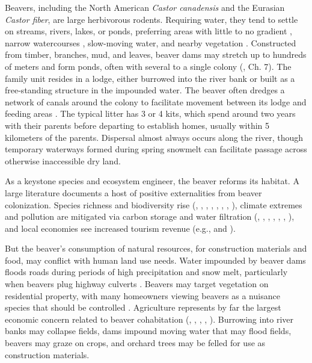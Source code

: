 Beavers, including the North American \textit{Castor canadensis} and the Eurasian \textit{Castor fiber}, are large herbivorous rodents. Requiring water, they tend to settle on streams, rivers, lakes, or ponds, preferring areas with little to no gradient \citep{muller-schwarze_beaver_2011}, narrow watercourses \citep{dittbrenner_modeling_2018}, slow-moving water, and nearby vegetation \citep{swinnen_environmental_2019}. Constructed from timber, branches, mud, and leaves, beaver dams may stretch up to hundreds of meters and form ponds, often with several to a single colony (\cite{muller-schwarze_beaver_2011}, Ch. 7). The family unit resides in a lodge, either burrowed into the river bank or built as a free-standing structure in the impounded water. The beaver often dredges a network of canals around the colony to facilitate movement between its lodge and feeding areas \citep{muller-schwarze_beaver_2011}. The typical litter has 3 or 4 kits, which spend around two years with their parents before departing to establish homes, usually within 5 kilometers of the parents. Dispersal almost always occurs along the river, though temporary waterways formed during spring snowmelt can facilitate passage across otherwise inaccessible dry land. 

As a keystone species and ecosystem engineer, the beaver reforms its habitat. A large literature documents a host of positive externalities from beaver colonization. Species richness and biodiversity rise (\cite{hossack_trends_2015}, \cite{wright_ecosystem_2002}, \cite{leidholt-bruner_beaver_1992}, \cite{bouwes_ecosystem_2016}, \cite{fedyn_beyond_2023}, \cite{kemp_qualitative_2012}, \cite{stringer_impacts_2016}, \cite{law_habitat_2016}), climate extremes and pollution are mitigated via carbon storage and water filtration (\cite{hood_beaver_2008}, \cite{dewey_beaver_2022}, \cite{johnston_beaver_2014}, \cite{fairfax_using_2018}, \cite{fairfax_smokey_2020}, \cite{lazar_beaver_2015}, \cite{wohl_landscape-scale_2013}), and local economies see increased tourism revenue (e.g., \cite{campbell_economic_2007} and \cite{auster_wildlife_2020}).

But the beaver's consumption of natural resources, for construction materials and food, may conflict with human land use needs. Water impounded by beaver dams floods roads during periods of high precipitation and snow melt, particularly when beavers plug highway culverts \citep{jensen_habitat_2001}. Beavers may target vegetation on residential property, with many homeowners viewing beavers as a nuisance species that should be controlled \citep{jonker_experiences_2006}. Agriculture represents by far the largest economic concern related to beaver cohabitation (\cite{hamilton_tayside_2015}, \cite{noauthor_beavers_2017}, \cite{mikulka_european_2020}, \cite{janiszewski_damage_2019}, \cite{campbell-palmer_managing_2015}). Burrowing into river banks may collapse fields, dams impound moving water that may flood fields, beavers may graze on crops, and orchard trees may be felled for use as construction materials.

